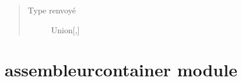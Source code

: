 \documentclass[letterpaper,10pt,french]{sphinxmanual}
\begin{document}
\begin{fulllineitems}
\begin{fulllineitems}
\begin{quote}
\begin{description}
\item[{Type renvoyé}] \leavevmode
Union{[}{\hyperref[\detokenize{variable:variable.Variable}]{}},{\hyperref[\detokenize{litteral:litteral.Litteral}]{}}{]}

\end{description}\end{quote}

\end{fulllineitems}


\end{fulllineitems}



\section{assembleurcontainer module}
\label{\detokenize{assembleurcontainer:module-assembleurcontainer}}\label{\detokenize{assembleurcontainer:assembleurcontainer-module}}\label{\detokenize{assembleurcontainer::doc}}\label{\detokenize{assembleurcontainer:module-assembleurconainer}}
\end{document}
